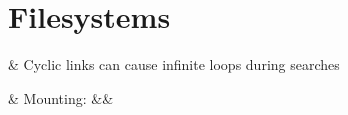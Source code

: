%
%
%

\section{Filesystems}
	\label{sec:filesystems}
\begin{easylist}

& Cyclic links can cause infinite loops during searches

& Mounting:
	&& 

\end{easylist}
\clearpage